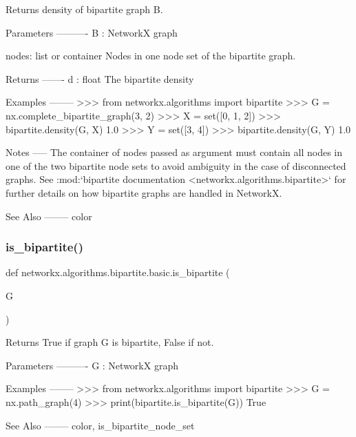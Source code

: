 \begin{DoxyVerb}Returns density of bipartite graph B.

Parameters
----------
B : NetworkX graph

nodes: list or container
  Nodes in one node set of the bipartite graph.

Returns
-------
d : float
   The bipartite density

Examples
--------
>>> from networkx.algorithms import bipartite
>>> G = nx.complete_bipartite_graph(3, 2)
>>> X = set([0, 1, 2])
>>> bipartite.density(G, X)
1.0
>>> Y = set([3, 4])
>>> bipartite.density(G, Y)
1.0

Notes
-----
The container of nodes passed as argument must contain all nodes
in one of the two bipartite node sets to avoid ambiguity in the
case of disconnected graphs.
See :mod:`bipartite documentation <networkx.algorithms.bipartite>`
for further details on how bipartite graphs are handled in NetworkX.

See Also
--------
color
\end{DoxyVerb}
 \mbox{\label{namespacenetworkx_1_1algorithms_1_1bipartite_1_1basic_ae7270bffa6310b169dab29de12670980}} 
\subsubsection{\texorpdfstring{is\+\_\+bipartite()}{is\_bipartite()}}
{\footnotesize\ttfamily def networkx.\+algorithms.\+bipartite.\+basic.\+is\+\_\+bipartite (\begin{DoxyParamCaption}\item[{}]{G }\end{DoxyParamCaption})}

\begin{DoxyVerb}Returns True if graph G is bipartite, False if not.

Parameters
----------
G : NetworkX graph

Examples
--------
>>> from networkx.algorithms import bipartite
>>> G = nx.path_graph(4)
>>> print(bipartite.is_bipartite(G))
True

See Also
--------
color, is_bipartite_node_set
\end{DoxyVerb}
 \mbox{\label{namespacenetworkx_1_1algorithms_1_1bipartite_1_1basic_ae6daf4a71e3df41c92b02c3004441681}} 
